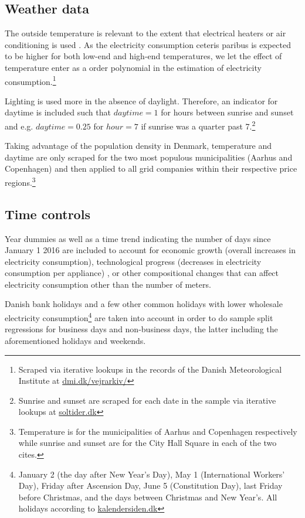 \subsection{Weather data}
\label{subsec:d_weather}
The outside temperature is relevant to the extent that electrical heaters or air conditioning is used \citep{lijesen2007real, vesterberg2014residential}. As the electricity consumption ceteris paribus is expected to be higher for both low-end and high-end temperatures, we let the effect of temperature enter as a  order polynomial in the estimation of electricity consumption.\footnote{Scraped via iterative lookups in the records of the Danish Meteorological Institute at \href{https://www.dmi.dk/vejrarkiv/}{dmi.dk/vejrarkiv/}}
\bigskip\par
Lighting is used more in the absence of daylight. Therefore, an indicator for daytime is included such that $daytime=1$ for hours between sunrise and sunset and e.g. $daytime=0.25$ for $hour=7$ if sunrise was a quarter past 7.\footnote{Sunrise and sunset are scraped for each date in the sample via iterative lookups at \href{https://soltider.dk/}{soltider.dk}}
\bigskip\par
Taking advantage of the population density in Denmark, temperature and daytime are only scraped for the two most populous municipalities (Aarhus and Copenhagen) and then applied to all grid companies within their respective price regions.\footnote{Temperature is for the municipalities of Aarhus and Copenhagen respectively while sunrise and sunset are for the City Hall Square in each of the two cites.}

\subsection{Time controls}
\label{subsec:d_time}
Year dummies as well as a time trend indicating the number of days since January 1 2016 are included to account for economic growth (overall increases in electricity consumption), technological progress (decreases in electricity consumption per appliance) \citep{lijesen2007real}, or other compositional changes that can affect electricity consumption other than the number of meters.
\bigskip\par
Danish bank holidays and a few other common holidays with lower wholesale electricity consumption\footnote{January 2 (the day after New Year's Day), May 1 (International Workers' Day), Friday after Ascension Day, June 5 (Constitution Day), last Friday before Christmas, and the days between Christmas and New Year's. All holidays according to \href{https://kalendersiden.dk/}{kalendersiden.dk}} are taken into account in order to do sample split regressions for business days and non-business days, the latter including the aforementioned holidays and weekends.
